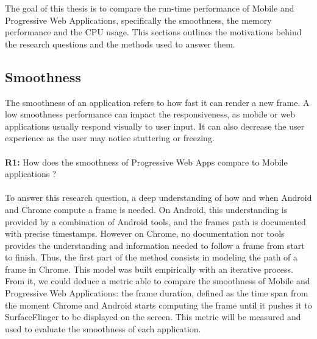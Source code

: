 The goal of this thesis is to compare the run-time performance of Mobile and Progressive Web Applications, specifically the smoothness, the memory performance and the CPU usage. This sections outlines the motivations behind the research questions and the methods used to answer them.


\subsection{Smoothness}

The smoothness of an application refers to how fast it can render a new frame. A low smoothness performance can impact the responsiveness, as mobile or web applications usually respond visually to user input. It can also decrease the user experience as the user may notice stuttering or freezing. 

\paragraph{}
\textbf{R1:} How does the smoothness of Progressive Web Apps compare to Mobile applications ?

\paragraph{}
To answer this research question, a deep understanding of how and when Android and Chrome compute a frame is needed. On Android, this understanding is provided by a combination of Android tools, and the frames path is documented with precise timestamps. However on Chrome, no documentation nor tools provides the understanding and information needed to follow a frame from start to finish. Thus, the first part of the method consists in modeling the path of a frame in Chrome. This model was built empirically with an iterative process. From it, we could deduce a metric able to compare the smoothness of Mobile and Progressive Web Applications: the frame duration, defined as the time span from the moment Chrome and Android starts computing the frame until it pushes it to SurfaceFlinger to be displayed on the screen. This metric will be measured and used to evaluate the smoothness of each application.

